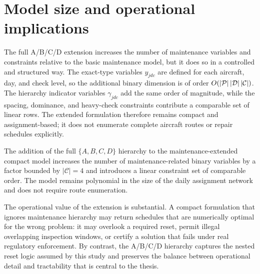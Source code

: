 \section{Model size and operational implications}
\label{sec:hierarchy_impact}

The full A/B/C/D extension increases the number of maintenance variables and
constraints relative to the basic maintenance model, but it does so in a controlled
and structured way. The exact-type variables $y_{jdc}$ are defined for each
 aircraft, day, and check level, so the additional binary dimension is of order
 $O(|\mathcal{P}|\,|\mathcal{D}|\,|\mathcal{C}|)$. The hierarchy indicator variables $\gamma_{jdc}$ add
 the same order of magnitude, while the spacing, dominance, and heavy-check
 constraints contribute a comparable set of linear rows. The extended formulation
 therefore remains compact and assignment-based; it does not enumerate complete
 aircraft routes or repair schedules explicitly.

\begin{proposition}
    The addition of the full $\{A,B,C,D\}$ hierarchy to the maintenance-extended
    compact model increases the number of maintenance-related binary variables by a
    factor bounded by $|\mathcal{C}|=4$ and introduces a linear constraint set of
    comparable order. The model remains polynomial in the size of the daily
    assignment network and does not require route enumeration.
\end{proposition}

The operational value of the extension is substantial. A compact formulation that
ignores maintenance hierarchy may return schedules that are numerically optimal
for the wrong problem: it may overlook a required reset, permit illegal
overlapping inspection windows, or certify a solution that fails under real
regulatory enforcement. By contrast, the A/B/C/D hierarchy captures the nested
reset logic assumed by this study and preserves the balance between operational
detail and tractability that is central to the thesis.
